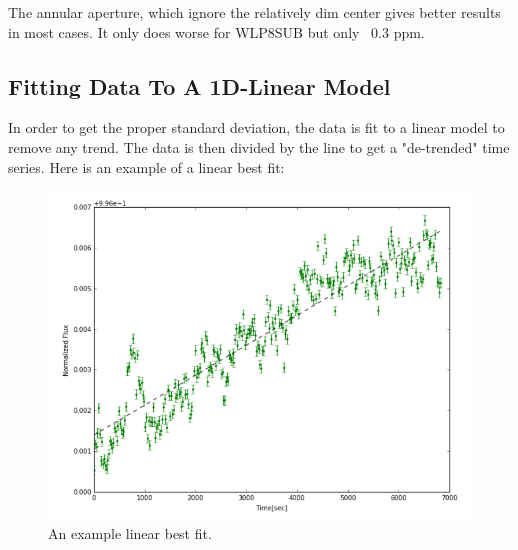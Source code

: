 \documentclass{aastex6}
\begin{document}
        The annular aperture, which ignore the relatively dim center gives better results in most cases. It only does worse for WLP8SUB but only ~0.3 ppm.
     
 
    \subsection{Fitting Data To A 1D-Linear Model}
    In order to get the proper standard deviation, the data is fit to a linear model to remove any trend. The data is then divided by the line to get a "de-trended" time series. Here is an example of a linear best fit:
    \begin{figure}[H]
        \includegraphics[scale=0.4]{Line}
        \caption{An example linear best fit.}
    \end{figure} 
    
    
\end{document}
